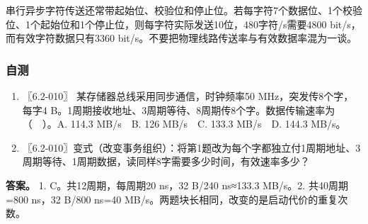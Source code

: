 串行异步字符传送还常带起始位、校验位和停止位。若每字符7个数据位、1个校验位、1个起始位和1个停止位，则每字符实际发送10位，480字符/s需要4800 bit/s，而有效字符数据只有3360 bit/s。不要把物理线路传送率与有效数据率混为一谈。

\subsubsection{自测}\label{co-self7}

\begin{enumerate}
\def\labelenumi{\arabic{enumi}.}
\tightlist
\item
  〖6.2-010〗 某存储器总线采用同步通信，时钟频率50 MHz，突发传8个字，每字4 B。1周期接收地址、3周期等待、8周期传8个字。数据传输速率为（　）。A. 114.3 MB/s　B. 126 MB/s　C. 133.3 MB/s　D. 144.3 MB/s。
\item
  〖6.2-010〗变式（改变事务组织）：将第1题改为每个字都独立付1周期地址、3周期等待、1周期数据，读同样8字需要多少时间，有效速率多少？
\end{enumerate}

\textbf{答案。} 1. C。共12周期，每周期20 ns，32 B/240 ns≈133.3 MB/s。2. 共40周期=800 ns，32 B/800 ns=40 MB/s。两题块长相同，改变的是启动代价的重复次数。
